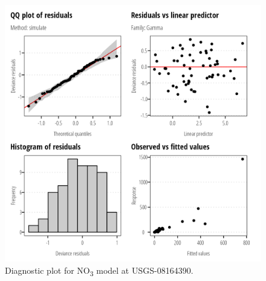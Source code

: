 \documentclass[
]{article}
\begin{document}
\clearpage

\begin{figure}[h]

{\centering \includegraphics{model_assessment_files/figure-pdf/unnamed-chunk-16-1.png}

}

\caption{Diagnostic plot for NO\textsubscript{3} model at
USGS-08164390.}

\end{figure}
\end{document}
